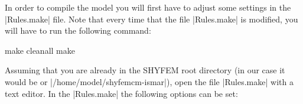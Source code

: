 
%
%
%
%
%
%
%
In order to compile the model you will first have to adjust some settings
in the |Rules.make| file.
Note that every time that the file |Rules.make| is modified,
you will have to run the following command:
\begin{codem}
make cleanall
make
\end{codem}
Assuming that you are already in the SHYFEM
root directory (in our case it would be \ttt{\shydir} or
|/home/model/shyfemcm-ismar|), open the file
|Rules.make| with a text editor.
In the |Rules.make| the following options
can be set:

